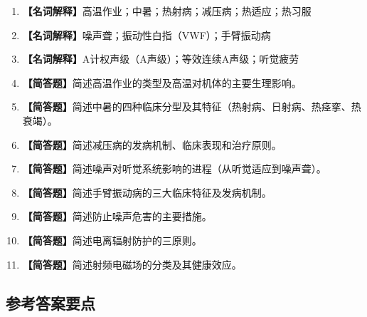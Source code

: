 \begin{enumerate}[leftmargin=*, itemsep=8pt]
    \item \textbf{【名词解释】}高温作业；中暑；热射病；减压病；热适应；热习服
    \item \textbf{【名词解释】}噪声聋；振动性白指（VWF）；手臂振动病
    \item \textbf{【名词解释】}A计权声级（A声级）；等效连续A声级；听觉疲劳
    \item \textbf{【简答题】}简述高温作业的类型及高温对机体的主要生理影响。
    \item \textbf{【简答题】}简述中暑的四种临床分型及其特征（热射病、日射病、热痉挛、热衰竭）。
    \item \textbf{【简答题】}简述减压病的发病机制、临床表现和治疗原则。
    \item \textbf{【简答题】}简述噪声对听觉系统影响的进程（从听觉适应到噪声聋）。
    \item \textbf{【简答题】}简述手臂振动病的三大临床特征及发病机制。
    \item \textbf{【简答题】}简述防止噪声危害的主要措施。
    \item \textbf{【简答题】}简述电离辐射防护的三原则。
    \item \textbf{【简答题】}简述射频电磁场的分类及其健康效应。
\end{enumerate}

\subsection*{参考答案要点}

